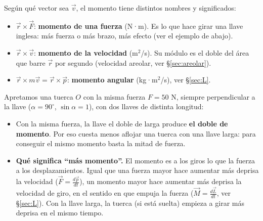 \documentclass[11pt,a4paper]{article}
\begin{document}
Según qué vector sea $\vec v$, el momento tiene distintos nombres y significados:
\begin{itemize}[itemsep=2pt]
  \item $\vec r\times\vec F$: \textbf{momento de una fuerza} (N·m). Es lo que hace girar una llave inglesa: más fuerza o más brazo, más efecto (ver el ejemplo de abajo).
  \item $\vec r\times\vec v$: \textbf{momento de la velocidad} (m$^2$/s). Su módulo es el doble del área que barre $\vec r$ por segundo (velocidad areolar, ver §\ref{sec:areolar}).
  \item $\vec r\times m\vec v=\vec r\times\vec p$: \textbf{momento angular} (kg·m$^2$/s), ver §\ref{sec:L}.
\end{itemize}

\begin{ejemplo}[title={Ejemplo: la llave inglesa (momento de una fuerza)}]
Apretamos una tuerca $O$ con la misma fuerza $F=50$ N, siempre perpendicular a la llave ($\alpha=90^\circ$, $\sin\alpha=1$), con dos llaves de distinta longitud:
\begin{center}
\end{center}
\begin{itemize}[itemsep=2pt]
  \item Con la misma fuerza, la llave el doble de larga produce \textbf{el doble de momento}. Por eso cuesta menos aflojar una tuerca con una llave larga: para conseguir el mismo momento basta la mitad de fuerza.
  \item \textbf{Qué significa ``más momento''.} El momento es a los giros lo que la fuerza a los desplazamientos. Igual que una fuerza mayor hace aumentar más deprisa la velocidad ($\vec F=\frac{d\vec p}{dt}$), un momento mayor hace aumentar más deprisa la velocidad de giro, en el sentido en que empuja la fuerza ($\vec M=\frac{d\vec L}{dt}$, ver §\ref{sec:L}). Con la llave larga, la tuerca (si está suelta) empieza a girar más deprisa en el mismo tiempo.

\end{itemize}
\end{ejemplo}
\end{document}
